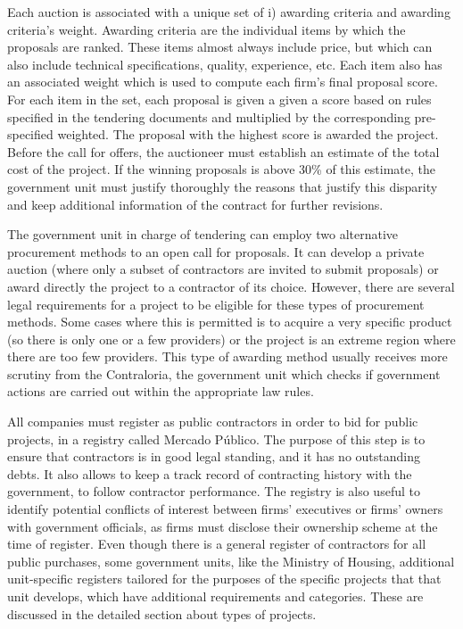 Each auction is associated with a unique set of i) awarding criteria and awarding criteria’s weight. Awarding criteria are the individual items by which the proposals are ranked. These items almost always include price, but which can also include technical specifications, quality, experience, etc. Each item also has an associated weight which is used to compute each firm’s final proposal score. For each item in the set, each proposal is given a given a score based on rules specified in the tendering documents and multiplied by the corresponding pre-specified weighted. The proposal with the highest score is awarded the project.
Before the call for offers, the auctioneer must establish an estimate of the total cost of the project. If the winning proposals is above 30\% of this estimate, the government unit must justify thoroughly the reasons that justify this disparity and keep additional information of the contract for further revisions.

The government unit in charge of tendering can employ two alternative procurement methods to an open call for proposals. It can develop a private auction (where only a subset of contractors are invited to submit proposals) or award directly the project to a contractor of its choice. However, there are several legal requirements for a project to be eligible for these types of procurement methods. Some cases where this is permitted is to acquire a very specific product (so there is only one or a few providers) or the project is an extreme region where there are too few providers. This type of awarding method usually receives more scrutiny from the Contraloria, the government unit which checks if government actions are carried out within the appropriate law rules.

All companies must register as public contractors in order to bid for public projects, in a registry called Mercado Público. The purpose of this step is to ensure that contractors is in good legal standing, and it has no outstanding debts. It also allows to keep a track record of contracting history with the government, to follow contractor performance. The registry is also useful to identify potential conflicts of interest between firms’ executives or firms’ owners with government officials, as firms must disclose their ownership scheme at the time of register. Even though there is a general register of contractors for all public purchases, some government units, like the Ministry of Housing, additional unit-specific registers tailored for the purposes of the specific projects that that unit develops, which have additional requirements and categories. These are discussed in the detailed section about types of projects.

